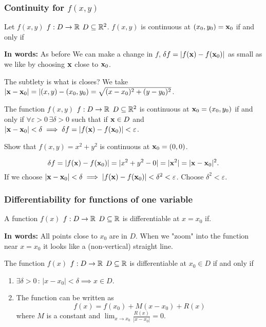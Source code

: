 \documentclass[10pt, a4paper]{article}
\begin{document}
\subsubsection{Continuity for \texorpdfstring{$f(x, y)$}{}}
Let $f(x, y)$ $f: D \rightarrow\mathbb{R}$ $D \subseteq \mathbb{R} ^ 2$.
$f(x, y)$ is continuous at $(x_0, y_0) = \mathbf{x}_0$ if and only if

\textbf{In words:}
As before We can make a change in $f$,
$\delta f = |f(\mathbf{x}) - f(\mathbf{x}_0)|$ as small as we like by choosing $\mathbf{x}$ close to $\mathbf{x}_0$.

The subtlety is what is closes?
We take $|\mathbf{x} - \mathbf{x}_0| = |(x, y) - (x_0, y_0) = \sqrt{(x - x_0) ^ 2 + (y - y_0) ^ 2}$.

\begin{definition}
    The function $f(x, y)$ $f : D \rightarrow \mathbb{R}$ $D \subseteq \mathbb{R} ^ 2$ is continuous at $\mathbf{x}_0 = (x_0, y_0)$ if and only if $\forall \varepsilon > 0\,\exists \delta > 0$ such that if $\mathbf{x} \in D$ and $|\mathbf{x} - \mathbf{x}_0| < \delta \implies \delta f = |f(\mathbf{x}) - f(\mathbf{x}_0)| < \varepsilon$.
\end{definition}

\begin{example}
    Show that $f(x, y) = x ^ 2 + y ^ 2$ is continuous at $\mathbf{x}_0 = (0, 0)$.
    \begin{solution}
        \[
        \delta f = |f(\mathbf{x}) - f(\mathbf{x}_0)| = |x ^ 2 + y ^ 2 - 0| = |\mathbf{x} ^ 2| = |\mathbf{x} - \mathbf{x}_0| ^ 2.
        \]
        If we choose $|\mathbf{x} - \mathbf{x}_0| < \delta \implies |f(\mathbf{x}) - f(\mathbf{x}_0)| < \delta ^ 2 < \varepsilon$.
        Choose $\delta ^ 2 < \varepsilon$.
    \end{solution}
\end{example}

\subsubsection{Differentiability for functions of one variable}
A function $f(x)$ $f : D \rightarrow \mathbb{R}$ $D \subseteq \mathbb{R}$ is differentiable at $x = x_0$ if.

\textbf{In words:}
All points close to $x_0$ are in $D$.
When we "zoom" into the function near $x = x_0$ it looks like a
(non-vertical)
straight line.

\begin{definition}[Differentiability]
    The function $f(x)$ $f : D \rightarrow \mathbb{R}$ $D \subseteq \mathbb{R}$ is differentiable at $x_0 \in D$ if and only if
    \begin{enumerate}[label = \arabic*)]
        \item $\exists \delta > 0\,:\,|x - x_0| < \delta \implies x \in D$.
        \item The function can be written as
        \[
        f(x) = f(x_0) + M(x - x_0) + R(x)
        \]
        where $M$ is a constant and $\lim_{x \rightarrow x_0}\frac{R(x)}{|x - x_0|} = 0$.
    \end{enumerate}
\end{definition}
\end{document}
